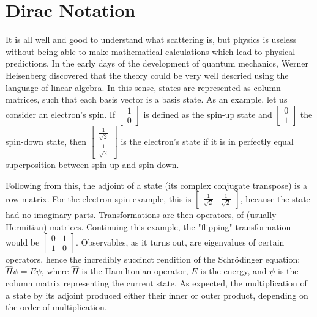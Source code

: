 \documentclass{report}
\begin{document}
\section{Dirac Notation}
It is all well and good to understand what scattering is, but physics is useless without being able to make mathematical calculations which lead to physical predictions. In the early days of the development of quantum mechanics, Werner Heisenberg discovered that the theory could be very well descried using the language of linear algebra. In this sense, states are represented as column matrices, such that each basis vector is a basis state. As an example, let us consider an electron's spin. If $\begin{bmatrix} 1 \\ 0 \end{bmatrix}$ is defined as the spin-up state and $\begin{bmatrix} 0 \\ 1 \end{bmatrix}$ the spin-down state, then $\begin{bmatrix} \frac{1}{\sqrt{2}} \\ \frac{1}{\sqrt{2}} \end{bmatrix}$ is the electron's state if it is in perfectly equal superposition between spin-up and spin-down.

Following from this, the adjoint of a state (its complex conjugate transpose) is a row matrix. For the electron spin example, this is $\begin{bmatrix} \frac{1}{\sqrt{2}} & \frac{1}{\sqrt{2}} \end{bmatrix}$, because the state had no imaginary parts. Transformations are then operators, of (usually Hermitian) matrices. Continuing this example, the "flipping" transformation would be $\begin{bmatrix} 0 & 1 \\ 1 & 0 \end{bmatrix}$. Observables, as it turns out, are eigenvalues of certain operators, hence the incredibly succinct rendition of the Schrödinger equation: $\hat{H} \psi = E \psi$, where $\hat{H}$ is the Hamiltonian operator, $E$ is the energy, and $\psi$ is the column matrix representing the current state. As expected, the multiplication of a state by its adjoint produced either their inner or outer product, depending on the order of multiplication.
\end{document}
